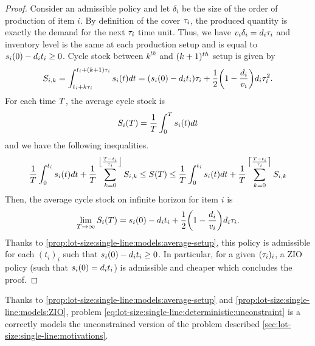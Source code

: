 \begin{proof}
Consider an admissible policy and let $\delta_i$ be the size of the order of production of item $i$.
By definition of the cover $\tau_i$, the produced quantity is exactly the demand for the next $\tau_i$ time unit.
Thus, we have $v_i\delta_i=d_i\tau_i$ and inventory level is the same at each production setup and is equal to $s_i(0)-d_i t_i \ge 0$.
Cycle stock between $k^{th}$ and $\bracket{k+1}^{th}$ setup is given by
\begin{equation}
  S_{i,k}
  =
  \int_{t_i+k\cover_i}^{t_i+\bracket{k+1}\cover_i}\inventory_i(t)dt
  =
  \bracket{\inventory_i(0)-\demand_i t_i}\cover_i
  + \frac{1}{2}\bracket{1-\frac{\demand_i}{\rate_i}}\demand_i\cover_i^2.
\end{equation}
For each time $T$, the average cycle stock is
\begin{equation}
  S_i\bracket{\horizon} = \frac{1}{\horizon} \int_0^{\horizon}\inventory_i(t)dt
\end{equation}
and we have the following inequalities.
\begin{equation}
  \frac{1}{\horizon} \int_0^{t_i}\inventory_i(t)dt
  + \frac{1}{\horizon} \sum_{k=0}^{\left\lfloor\frac{\horizon-t_i}{\cover_i}\right\rfloor} S_{i,k}
  \le
  S\bracket{\horizon}
  \le
  \frac{1}{\horizon} \int_0^{t_i}\inventory_i(t)dt
  + \frac{1}{\horizon} \sum_{k=0}^{\left\lceil\frac{\horizon-t_i}{\cover_i}\right\rceil} S_{i,k}
\end{equation}
Then, the average cycle stock on infinite horizon for item $i$ is
\begin{equation}
  \lim_{\horizon\rightarrow\infty} S_i\bracket{\horizon}
  =
  \inventory_i(0)-\demand_i t_i
  + \frac{1}{2}\bracket{1-\frac{\demand_i}{\rate_i}}\demand_i\cover_i.
\end{equation}
Thanks to \cref{prop:lot-size:single-line:models:average-setup}, this policy is admissible for each $(t_i)_i$ such that $s_i(0)-d_i t_i\ge 0$.
In particular, for a given $\bracket{\cover_i}_i$, a ZIO policy (\ie such that $s_i(0)=d_i t_i$) is admissible and cheaper which concludes the proof.
\end{proof}


Thanks to \cref{prop:lot-size:single-line:models:average-setup} and \cref{prop:lot-size:single-line:models:ZIO}, problem \eqref{eq:lot-size:single-line:deterministic:unconstraint} is a correctly models the unconstrained version of the problem described \cref{sec:lot-size:single-line:motivations}.


